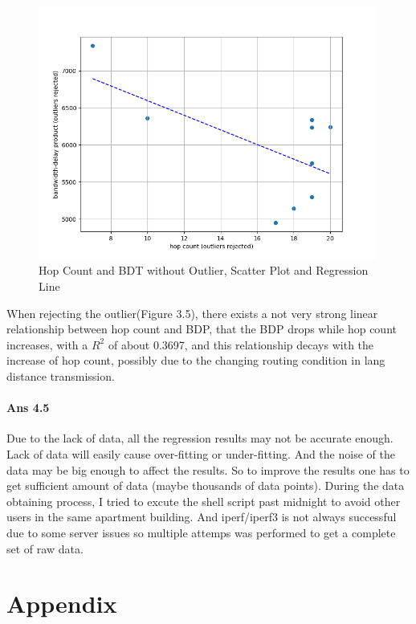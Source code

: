 \documentclass[paper=a4, fontsize=10pt]{scrartcl} %
\numberwithin{equation}{section} %
\numberwithin{figure}{section} %
\numberwithin{table}{section} %
\begin{document}
\begin{figure}[htbp!]
    \centering
    \includegraphics[width=0.99\textwidth]{hop_bdp_linear_fit_outliers_rejected.png}
    \caption{Hop Count and BDT without Outlier, Scatter Plot and Regression Line}%
    \vspace{-1em}
\end{figure}

When rejecting the outlier(Figure 3.5), there exists a not very strong linear relationship between hop count and BDP, that the BDP drops while hop count increases, with a $ R^2$ of about 0.3697, and this relationship decays with the increase of hop count, possibly due to the changing routing condition in lang distance transmission.


\paragraph{Ans 4.5}
Due to the lack of data, all the regression results may not be accurate enough. Lack of data will easily cause over-fitting or under-fitting. And the noise of the data may be big enough to affect the results. So to improve the results one has to get sufficient amount of data (maybe thousands of data points). During the data obtaining process, I tried to excute the shell script past midnight to avoid other users in the same apartment building. And iperf/iperf3 is not always successful due to some server issues so multiple attemps was performed to get a complete set of raw data.




\newpage

\newpage
\section*{Appendix}
\end{document}

